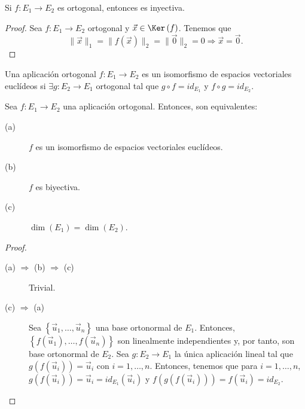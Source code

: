 \begin{fprop}[]
\normalfont Si $\displaystyle f : E_{1} \to E_{2}$ es ortogonal, entonces es inyectiva.
\end{fprop}
\begin{proof}
Sea $\displaystyle f : E_{1} \to E_{2} $ ortogonal y $\displaystyle \vec{x} \in \Ker\left(f\right) $. Tenemos que
\[ \|\vec{x}\|_{1} = \|f\left(\vec{x}\right)\|_{2} = \|\vec{0}\|_{2} = 0 \Rightarrow \vec{x} = \vec{0} .\]
\end{proof}
\begin{fdefinition}[]
\normalfont Una aplicación ortogonal $\displaystyle f : E_{1} \to E_{2} $ es un isomorfismo de espacios vectoriales euclídeos si $\displaystyle \exists g : E_{2} \to E_{1} $ ortogonal tal que $\displaystyle g \circ f = id _{E_{1}} $ y $\displaystyle f \circ g = id _{E_{2}} $.
\end{fdefinition}
\begin{ftheorem}[]
\normalfont Sea $\displaystyle f : E_{1} \to E_{2} $ una aplicación ortogonal. Entonces, son equivalentes:
\begin{description}
\item[(a)] $\displaystyle f $ es un isomorfismo de espacios vectoriales euclídeos.
\item[(b)] $\displaystyle f $ es biyectiva.
\item[(c)] $\displaystyle \dim\left(E_{1}\right) = \dim\left(E_{2}\right) $.
\end{description}
\end{ftheorem}
\begin{proof}
\begin{description}
\item[(a) $\displaystyle \Rightarrow $ (b) $\displaystyle \Rightarrow $ (c)] Trivial.
\item[(c) $\displaystyle \Rightarrow $ (a)] Sea $\displaystyle \left\{ \vec{u}_{1}, \ldots, \vec{u}_{n}\right\}  $ una base ortonormal de $\displaystyle E_{1} $. Entonces, $\displaystyle \left\{ f\left(\vec{u}_{1}\right), \ldots, f\left(\vec{u}_{n}\right)\right\}  $ son linealmente independientes y, por tanto, son base ortonormal de $\displaystyle E_{2} $. Sea $\displaystyle g : E_{2} \to E_{1} $ la única aplicación lineal tal que $\displaystyle g\left(f\left(\vec{u}_{i}\right)\right) = \vec{u}_{i} $ con $\displaystyle i = 1, \ldots, n $.
Entonces, tenemos que para $\displaystyle i = 1, \ldots, n $, $\displaystyle g\left(f\left(\vec{u}_{i}\right)\right) = \vec{u}_{i} = id _{E_{1}}\left(\vec{u}_{i}\right) $ y $\displaystyle f\left(g\left(f\left(\vec{u}_{i}\right)\right)\right) = f\left(\vec{u}_{i}\right) = id _{E_{2}} $.
\end{description}
\end{proof}
